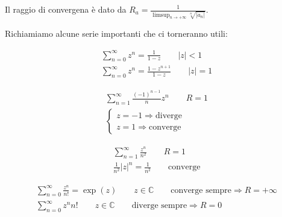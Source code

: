 \documentclass[a4paper, oneside]{article}
\begin{document}
    \begin{theorem}
        Il raggio di convergena è dato da $R_a = \frac{1}{\limsup_{n \to +\infty} \sqrt[n]{|a_n|}}$.
    \end{theorem}
    Richiamiamo alcune serie importanti che ci torneranno utili:
    \begin{proposition}
        \begin{gather*}
            \sum_{n=0}^{\infty} z^n = \frac{1}{1-z} \qquad |z| < 1\\
            \sum_{n=0}^{\infty}z^n = \frac{1-z^{n+1}}{1-z} \qquad |z| = 1
        \end{gather*}
    \end{proposition}
    \begin{proposition}
        \begin{gather*}
            \sum_{n=1}^{\infty} \frac{(-1)^{n-1}}{n} z^n \qquad R = 1\\
            \begin{cases}
                z = -1 \Rightarrow \text{diverge}\\
                z = 1 \Rightarrow \text{converge}
            \end{cases}
        \end{gather*}
    \end{proposition}
    \begin{proposition}
        \begin{gather*}
            \sum_{n=1}^{\infty} \frac{z^n}{n^2} \qquad R = 1\\
            \frac{1}{n^2} |z|^n = \frac{1}{n^2} \qquad \text{converge}
        \end{gather*}
    \end{proposition}
    \begin{proposition}
        \begin{gather*}
            \sum_{n=0}^{\infty} \frac{z^n}{n!} = \exp(z) \qquad z \in \mathbb{C} \qquad \text{converge sempre} \Rightarrow R = +\infty\\
            \sum_{n=0}^{\infty} z^n n! \qquad z \in \mathbb{C} \qquad \text{diverge sempre} \Rightarrow R = 0
        \end{gather*}
    \end{proposition}
\end{document}
